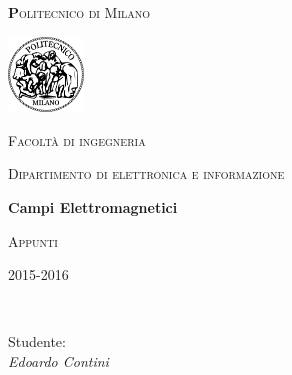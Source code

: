 \begin{titlepage}

	\centering
	{\scshape\huge\textbf Politecnico di Milano \par}
	\vspace{0.5cm}

	\includegraphics[width=0.15\textwidth]{Immagini/logo.png}\par\vspace{0.2cm}
	
	{\scshape\small Facoltà di ingegneria\par}
	{\scshape\small Dipartimento di elettronica e informazione\par}
	\vspace{1.5cm}
	{\huge\bfseries Campi Elettromagnetici\par}
	\vspace{1.5cm}
	{\scshape Appunti\par}
	{\scshape\small 2015-2016 \par}
	\vspace{2cm}
	\vfill
    \\[1cm]
	
	\raggedright
    {Studente:\\ \textit{Edoardo Contini}
	
	}\vfill
	
	\end{titlepage}
